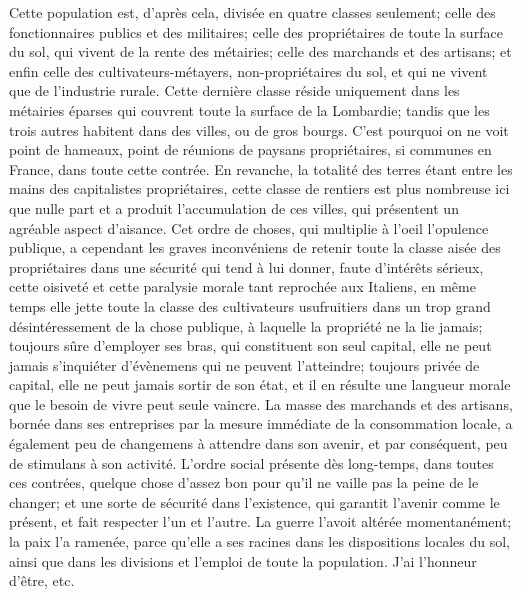 Cette population est, d'après cela, divisée en quatre classes seulement; celle des fonctionnaires publics et des militaires; celle\setcounter{page}{443} des propriétaires de toute la surface du sol, qui vivent de la rente des métairies; celle des marchands et des artisans; et enfin celle des cultivateurs-métayers, non-propriétaires du sol, et qui ne vivent que de l'industrie rurale.
Cette dernière classe réside uniquement dans les métairies éparses qui couvrent toute la surface de la Lombardie; tandis que les trois autres habitent dans des villes, ou de gros bourgs. C'est pourquoi on ne voit point de hameaux, point de réunions de paysans propriétaires, si communes en France, dans toute cette contrée. En revanche, la totalité des terres étant entre les mains des capitalistes propriétaires, cette classe de rentiers est plus nombreuse ici que nulle part et a produit l'accumulation de ces villes, qui présentent un agréable aspect d'aisance.
Cet ordre de choses, qui multiplie à l'oeil l'opulence publique, a cependant les graves inconvéniens de retenir toute la classe aisée des propriétaires dans une sécurité qui tend à lui donner, faute d'intérêts sérieux, cette oisiveté et cette paralysie morale tant reprochée aux Italiens, en même temps elle jette toute la classe des cultivateurs usufruitiers dans un trop grand désintéressement de la chose publique, à laquelle la propriété ne\setcounter{page}{444} la lie jamais; toujours sûre d'employer ses bras, qui constituent son seul capital, elle ne peut jamais s'inquiéter d'évènemens qui ne peuvent l'atteindre; toujours privée de capital, elle ne peut jamais sortir de son état, et il en résulte une langueur morale que le besoin de vivre peut seule vaincre.
La masse des marchands et des artisans, bornée dans ses entreprises par la mesure immédiate de la consommation locale, a également peu de changemens à attendre dans son avenir, et par conséquent, peu de stimulans à son activité. L'ordre social présente dès long-temps, dans toutes ces contrées, quelque chose d'assez bon pour qu'il ne vaille pas la peine de le changer; et une sorte de sécurité dans l'existence, qui garantit l'avenir comme le présent, et fait respecter l'un et l'autre.
La guerre l'avoit altérée momentanément; la paix l'a ramenée, parce qu'elle a ses racines dans les dispositions locales du sol, ainsi que dans les divisions et l'emploi de toute la population.
J'ai l'honneur d'être, etc.